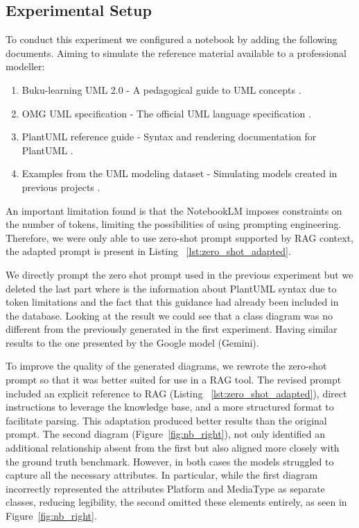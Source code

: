 \subsection{Experimental Setup}

To conduct this experiment  we configured a notebook by adding the following documents.
Aiming to simulate the reference material available to a professional modeller:
\begin{enumerate}
    \item Buku-learning UML 2.0 - A pedagogical guide to UML concepts \cite{Miles2006}.
    \item OMG UML specification - The official UML language specification \cite{OMG2017}.
    \item PlantUML reference guide - Syntax and rendering documentation for PlantUML \cite{PlantUMLGuide}.
    \item Examples from the UML modeling dataset - Simulating models created in previous projects \cite{DatasetDeBari2024}.
\end{enumerate}

An important limitation found is that the NotebookLM imposes constraints on the number of tokens, limiting the possibilities of using prompting engineering. Therefore, we were only able to use zero-shot prompt supported by RAG context, the adapted prompt is present in Listing ~\ref{lst:zero_shot_adapted}.

We directly prompt the zero shot prompt used in the previous experiment but we deleted the last part where is the information about PlantUML syntax due to token limitations and the fact that this guidance had already been included in the database.
Looking at the result we could see that a class diagram was no different from the previously generated in the first experiment. Having similar results to the one presented by the Google model (Gemini).

To improve the quality of the generated diagrams, we rewrote the zero-shot prompt so that it was better suited for use in a RAG tool. 
The revised prompt included an explicit reference to RAG (Listing ~\ref{lst:zero_shot_adapted}), direct instructions to leverage the knowledge base, and a more structured format to facilitate parsing.
This adaptation produced better results than the original prompt. The second diagram (Figure~\ref{fig:nb_right}), not only identified an additional relationship absent from the first but also aligned more closely with the ground truth benchmark.
However, in both cases the models struggled to capture all the necessary attributes. In particular, while the first diagram incorrectly represented the attributes Platform and MediaType as separate classes, reducing legibility, the second omitted these elements entirely, as seen in Figure~\ref{fig:nb_right}.


